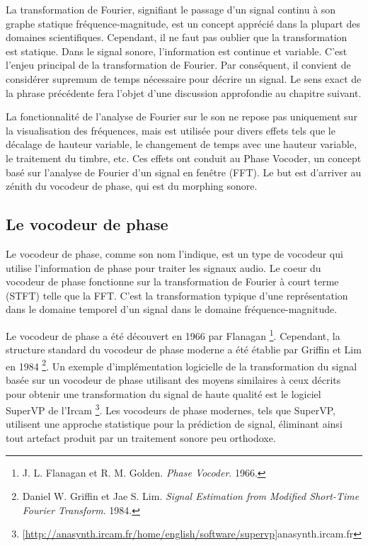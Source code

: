 La transformation de Fourier, signifiant le passage d'un signal continu à son graphe statique fréquence-magnitude, est un concept apprécié dans la plupart des domaines scientifiques. Cependant, il ne faut pas oublier que la transformation est statique. Dans le signal sonore, l'information est continue et variable. C'est l'enjeu principal de la transformation de Fourier. Par conséquent, il convient de considérer supremum de temps nécessaire pour décrire un signal. Le sens exact de la phrase précédente fera l’objet d’une discussion approfondie au chapitre suivant.

La fonctionnalité de l'analyse de Fourier sur le son ne repose pas uniquement sur la visualisation des fréquences, mais est utilisée pour divers effets tels que le décalage de hauteur variable, le changement de temps avec une hauteur variable, le traitement du timbre, etc. Ces effets ont conduit au Phase Vocoder, un concept basé sur l'analyse de Fourier d'un signal en fenêtre (FFT). Le but est d’arriver au zénith du vocodeur de phase, qui est du morphing sonore.

	\subsection{Le vocodeur de phase}

Le vocodeur de phase, comme son nom l'indique, est un type de vocodeur qui utilise l'information de phase pour traiter les signaux audio. Le coeur du vocodeur de phase fonctionne sur la transformation de Fourier à court terme (STFT) telle que la FFT. C'est la transformation typique d'une représentation dans le domaine temporel d'un signal dans le domaine fréquence-magnitude.

Le vocodeur de phase a été découvert en 1966 par Flanagan \footnote{J. L. Flanagan et R. M. Golden. \textit{Phase Vocoder}. 1966. \nocite {flanagan}}. Cependant, la structure standard du vocodeur de phase moderne a été établie par Griffin et Lim en 1984 \footnote{Daniel W. Griffin et Jae S. Lim. \textit{Signal Estimation from Modified Short-Time Fourier Transform}. 1984. \nocite{GrL84}}. Un exemple d'implémentation logicielle de la transformation du signal basée sur un vocodeur de phase utilisant des moyens similaires à ceux décrits pour obtenir une transformation du signal de haute qualité est le logiciel SuperVP de l'Ircam \footnote{\ref{http://anasynth.ircam.fr/home/english/software/supervp}{anasynth.ircam.fr}}. Les vocodeurs de phase modernes, tels que SuperVP, utilisent une approche statistique pour la prédiction de signal, éliminant ainsi tout artefact produit par un traitement sonore peu orthodoxe.

